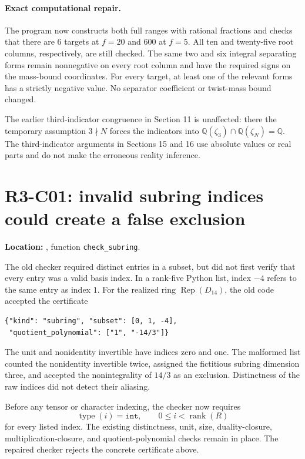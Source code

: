 \documentclass[11pt,a4paper]{article}
\begin{document}
\paragraph{Exact computational repair.}
The program now constructs both full ranges with rational fractions
and checks that there are 6 targets at $f=20$ and 600 at $f=5$.
All ten and twenty-five root columns, respectively, are still checked.
The same two and six integral separating forms remain nonnegative
on every root column and have the required signs on the mass-bound
coordinates. For every target, at least one of the relevant forms
has a strictly negative value.
No separator coefficient or twist-mass bound changed.

The earlier third-indicator congruence in Section 11 is unaffected:
there the temporary assumption $3\nmid N$ forces the indicators
into $\mathbb Q(\zeta_3)\cap\mathbb Q(\zeta_N)=\mathbb Q$.
The third-indicator arguments in Sections 15 and 16 use absolute
values or real parts and do not make the erroneous reality inference.

\section{R3-C01: invalid subring indices could create a false exclusion}

\textbf{Location:} ,
function \texttt{check\_subring}.

The old checker required distinct entries in a subset, but did not
first verify that every entry was a valid basis index. In a rank-five
Python list, index $-4$ refers to the same entry as index $1$.
For the realized ring $\operatorname{Rep}(D_{14})$, the old code
accepted the certificate
\begin{verbatim}
{"kind": "subring", "subset": [0, 1, -4],
 "quotient_polynomial": ["1", "-14/3"]}
\end{verbatim}
The unit and nonidentity invertible have indices zero and one. The
malformed list counted the nonidentity invertible twice, assigned
the fictitious subring dimension three, and accepted the
nonintegrality of $14/3$ as an exclusion. Distinctness of the raw
indices did not detect their aliasing.

Before any tensor or character indexing, the checker now requires
\[
 \operatorname{type}(i)=\texttt{int},\qquad
                         0\le i<\operatorname{rank}(R)
\]
for every listed index. The existing distinctness, unit, size,
duality-closure, multiplication-closure, and quotient-polynomial
checks remain in place. The repaired checker rejects the concrete
certificate above.
\end{document}
